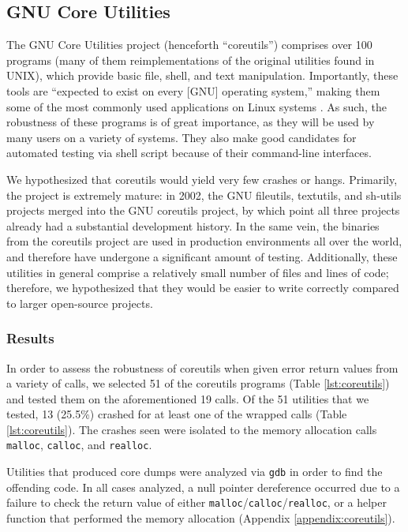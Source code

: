 \subsection{GNU Core Utilities}
The GNU Core Utilities project (henceforth ``coreutils'') comprises over 100 programs (many of them reimplementations of the original utilities found in UNIX), which provide basic file, shell, and text manipulation. Importantly, these tools are ``expected to exist on every [GNU] operating system,'' making them some of the most commonly used applications on Linux systems \cite{coreutils}. As such, the robustness of these programs is of great importance, as they will be used by many users on a variety of systems. They also make good candidates for automated testing via shell script because of their command-line interfaces.

We hypothesized that coreutils would yield very few crashes or hangs. Primarily, the project is extremely mature: in 2002, the GNU fileutils, textutils, and sh-utils projects merged into the GNU coreutils project, by which point all three projects already had a substantial development history. In the same vein, the binaries from the coreutils project are used in production environments all over the world, and therefore have undergone a significant amount of testing. Additionally, these utilities in general comprise a relatively small number of files and lines of code; therefore, we hypothesized that they would be easier to write correctly compared to larger open-source projects.

\subsubsection{Results}
In order to assess the robustness of coreutils when given error return values from a variety of calls, we selected 51 of the coreutils programs (Table \ref{lst:coreutils}) and tested them on the aforementioned 19 calls. Of the 51 utilities that we tested, 13 (25.5\%) crashed for at least one of the wrapped calls (Table \ref{lst:coreutils}). The crashes seen were isolated to the memory allocation calls \texttt{malloc}, \texttt{calloc}, and \texttt{realloc}. 

Utilities that produced core dumps were analyzed via \texttt{gdb} in order to find the offending code. In all cases analyzed, a null pointer dereference occurred due to a failure to check the return value of either \texttt{malloc}/\texttt{calloc}/\texttt{realloc}, or a helper function that performed the memory allocation (Appendix \ref{appendix:coreutils}).

